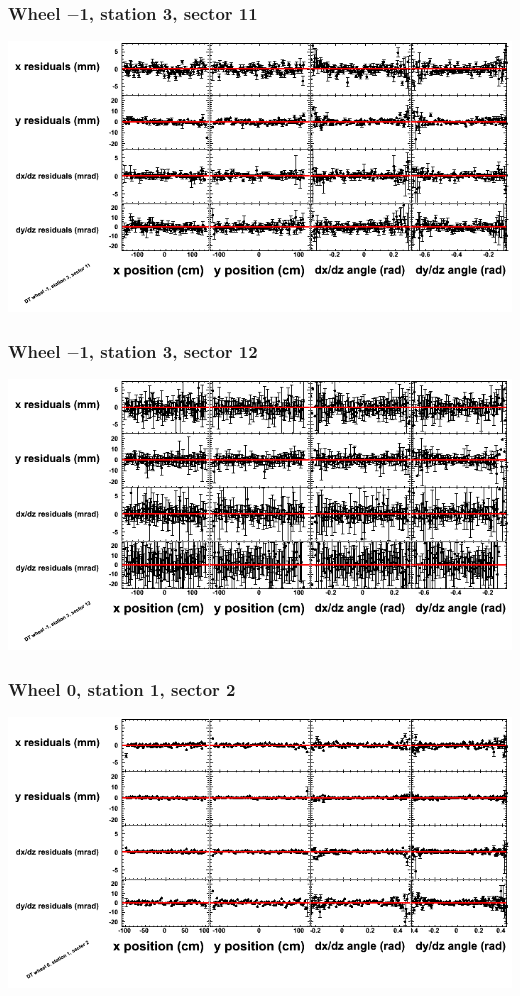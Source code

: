 \documentclass[compress]{beamer}
\begin{document}
\begin{frame}
\frametitle{Wheel $-$1, station 3, sector 11}
\includegraphics[width=\linewidth]{tmppoly_MBwhBst3sec11.png}
\end{frame}

\begin{frame}
\frametitle{Wheel $-$1, station 3, sector 12}
\includegraphics[width=\linewidth]{tmppoly_MBwhBst3sec12.png}
\end{frame}

\begin{frame}
\frametitle{Wheel 0, station 1, sector 2}
\includegraphics[width=\linewidth]{tmppoly_MBwhCst1sec02.png}
\end{frame}
\end{document}
